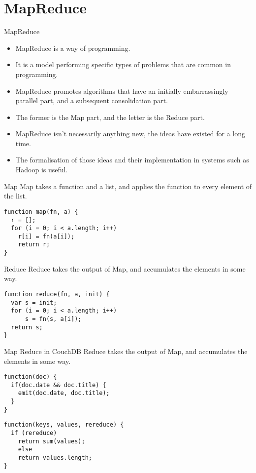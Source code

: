 \section{MapReduce}

\begin{frame}{MapReduce}
	\begin{itemize}
		\item MapReduce is a way of programming.
		\item It is a model performing specific types of problems that are common in programming.
		\item MapReduce promotes algorithms that have an initially embarrassingly parallel part, and a subsequent consolidation part.
		\item The former is the Map part, and the letter is the Reduce part.
		\item MapReduce isn't necessarily anything new, the ideas have existed for a long time.
		\item The formalisation of those ideas and their implementation in systems such as Hadoop is useful.
	\end{itemize}
\end{frame}

\begin{frame}[fragile]{Map}
Map takes a function and a list, and applies the function to every element of the list.
  \begin{verbatim}
function map(fn, a) {
  r = [];
  for (i = 0; i < a.length; i++)
  	r[i] = fn(a[i]);
	return r;
}
	\end{verbatim}
\end{frame}

\begin{frame}[fragile]{Reduce}
Reduce takes the output of Map, and accumulates the elements in some way.
  \begin{verbatim}
function reduce(fn, a, init) {
  var s = init;
  for (i = 0; i < a.length; i++)
      s = fn(s, a[i]);
  return s;
}
	\end{verbatim}
\end{frame}

\begin{frame}[fragile]{Map Reduce in CouchDB}
Reduce takes the output of Map, and accumulates the elements in some way.
  \begin{verbatim}
function(doc) {
  if(doc.date && doc.title) {
    emit(doc.date, doc.title);
  }
}
	\end{verbatim}
	
  \begin{verbatim}
function(keys, values, rereduce) {
  if (rereduce)
    return sum(values);
	else
    return values.length;
}
	\end{verbatim}
	

\end{frame}